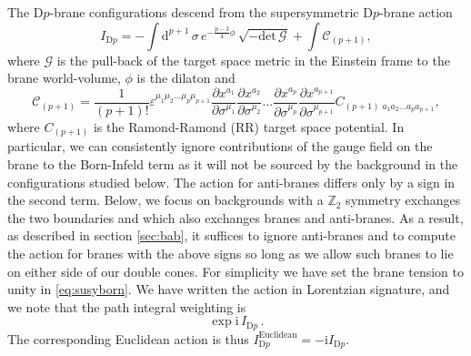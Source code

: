 \documentclass[11pt]{article}
\renewcommand{\i}{\mathrm{i}}
\begin{document}
The D$p$-brane configurations descend from the supersymmetric D$p$-brane action
\begin{equation}
I_{\mathrm{D}p} = - \int \mathrm{d}^{p+1}\,\sigma \,e^{-\frac{p-3}{4}\phi}\,\sqrt{-\mathrm{det}\,\mathcal{G}}+\int \mathcal{C}_{(p+1)},
\label{eq:susyborn}
\end{equation}
where $\mathcal{G}$ is the pull-back of the target space metric in the Einstein frame to the brane world-volume, $\phi$ is the dilaton and
\begin{equation}
\mathcal{C}_{(p+1)}=\frac{1}{(p+1)!}\varepsilon^{\mu_1\mu_2\ldots \mu_{p}\mu_{p+1}}\frac{\partial x^{a_1}}{\partial \sigma^{\mu_1}}\frac{\partial x^{a_2}}{\partial \sigma^{\mu_2}}\ldots \frac{\partial x^{a_p}}{\partial \sigma^{\mu_p}}\frac{\partial x^{a_{p+1}}}{\partial \sigma^{\mu_{p+1}}}C_{(p+1)\;a_1 a_2\ldots a_p a_{p+1}},
\end{equation}
where $C_{(p+1)}$ is the Ramond-Ramond (RR) target space potential.  
In particular, we can consistently ignore contributions of the gauge field on the brane to the Born-Infeld term as it will not be sourced by the background in the configurations studied below.  
The action for anti-branes differs only by a sign in the second term.
Below, we focus on backgrounds with a $\mathbb{Z}_2$ symmetry exchanges the two boundaries and which also exchanges branes and anti-branes.  
As a result, as described in section \ref{sec:bab}, it suffices to ignore anti-branes and to compute the action for branes with the above signs so long as we allow such branes to lie on either side of our double cones.  For simplicity we have set the brane tension to unity in \eqref{eq:susyborn}.
We have written the action in Lorentzian signature, and we note that the path integral weighting is
\begin{equation}
\exp{\i\,I_{\mathrm{D}p}}\,.
\end{equation}
The corresponding Euclidean action is thus $I^{\text{Euclidean}}_{\mathrm{D}p}= -\i I_{\mathrm{D}p}$.
\end{document}
